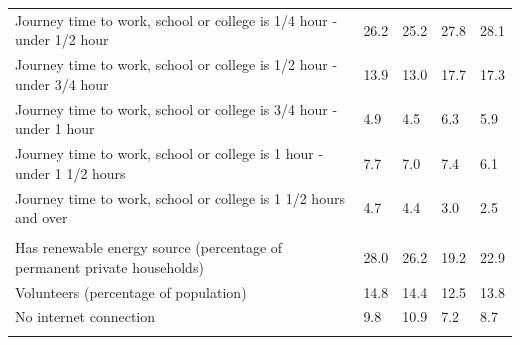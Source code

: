 \documentclass{article}
\begin{document}
\begin{table}[h]
\begin{tabular}{KTTTT}
Journey time to work, school or college is 1/4 hour - under 1/2 hour & 26.2& 25.2& 27.8& 28.1\\
Journey time to work, school or college is 1/2 hour - under 3/4 hour & 13.9& 13.0& 17.7& 17.3\\
Journey time to work, school or college is 3/4 hour - under 1 hour & 4.9& 4.5& 6.3& 5.9\\
Journey time to work, school or college is 1 hour - under 1 1/2 hours & 7.7& 7.0& 7.4& 6.1\\
Journey time to work, school or college is 1 1/2 hours and over & 4.7& 4.4& 3.0& 2.5\\
\hline
    \\ 
    \hline
Has renewable energy source (percentage of permanent private households) & 28.0& 26.2& 19.2& 22.9\\
    \hline
Volunteers (percentage of population) & 14.8& 14.4& 12.5& 13.8\\
    \hline
No internet connection&  9.8& 10.9&  7.2&  8.7\\
\hline
\end{tabular}
\end{table}
\end{document}
